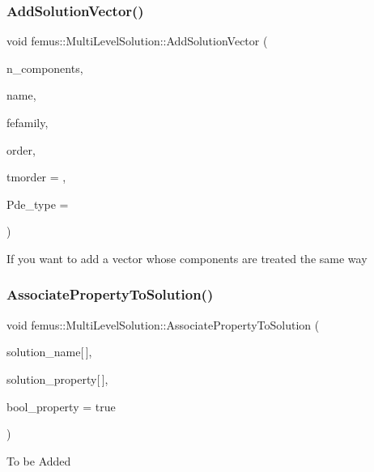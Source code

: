 \subsubsection{\texorpdfstring{Add\+Solution\+Vector()}{AddSolutionVector()}}
{\footnotesize\ttfamily void femus\+::\+Multi\+Level\+Solution\+::\+Add\+Solution\+Vector (\begin{DoxyParamCaption}\item[{const unsigned}]{n\+\_\+components,  }\item[{const std\+::string}]{name,  }\item[{const \mbox{\hyperlink{_f_elem_type_enum_8hpp_a7c9a70b7c6b5baf5d7942938d770a664}{F\+E\+Family}}}]{fefamily,  }\item[{const \mbox{\hyperlink{_f_elem_type_enum_8hpp_a00ea9562f0dbb25e22bb3297d596e3ba}{F\+E\+Order}}}]{order,  }\item[{unsigned}]{tmorder = {},  }\item[{const bool \&}]{Pde\+\_\+type = {} }\end{DoxyParamCaption})}

If you want to add a vector whose components are treated the same way \mbox{\label{classfemus_1_1_multi_level_solution_ab34c5b431e194c7748227e3a68bd9a40}} 
\subsubsection{\texorpdfstring{Associate\+Property\+To\+Solution()}{AssociatePropertyToSolution()}}
{\footnotesize\ttfamily void femus\+::\+Multi\+Level\+Solution\+::\+Associate\+Property\+To\+Solution (\begin{DoxyParamCaption}\item[{const char}]{solution\+\_\+name\mbox{[}$\,$\mbox{]},  }\item[{const char}]{solution\+\_\+property\mbox{[}$\,$\mbox{]},  }\item[{const bool \&}]{bool\+\_\+property = {\ttfamily true} }\end{DoxyParamCaption})}

To be Added \mbox{\label{classfemus_1_1_multi_level_solution_abef48eba2d16ef9fba42154e1703cd39}} 
